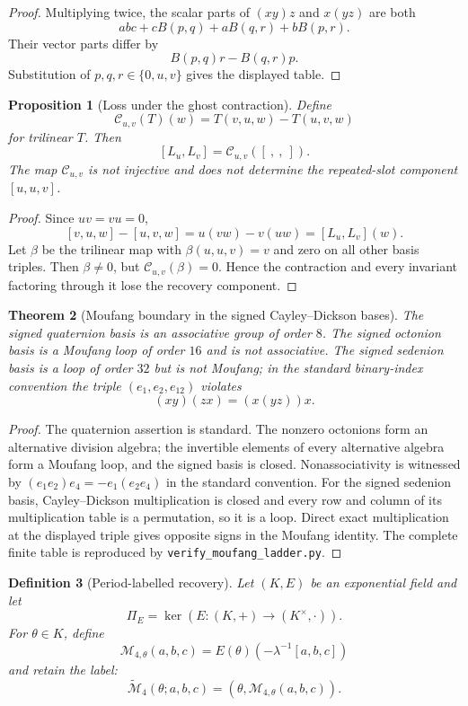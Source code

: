 \documentclass[11pt]{article}
\newtheorem{definition}{Definition}
\newtheorem{theorem}[definition]{Theorem}
\newtheorem{proposition}[definition]{Proposition}
\begin{document}
\begin{proof}
Multiplying twice, the scalar parts of $(xy)z$ and $x(yz)$ are both
\[
abc+cB(p,q)+aB(q,r)+bB(p,r).
\]
Their vector parts differ by
\[
B(p,q)r-B(q,r)p.
\]
Substitution of $p,q,r\in\{0,u,v\}$ gives the displayed table.
\end{proof}

\begin{proposition}[Loss under the ghost contraction]
Define
\[
\mathcal C_{u,v}(T)(w)=T(v,u,w)-T(u,v,w)
\]
for trilinear $T$.  Then
\[
[L_u,L_v]=\mathcal C_{u,v}([\ ,\ ,\ ]).
\]
The map $\mathcal C_{u,v}$ is not injective and does not determine the repeated-slot component $[u,u,v]$.
\end{proposition}

\begin{proof}
Since $uv=vu=0$,
\[
[v,u,w]-[u,v,w]=u(vw)-v(uw)=[L_u,L_v](w).
\]
Let $\beta$ be the trilinear map with $\beta(u,u,v)=v$ and zero on all other basis triples.  Then $\beta\ne0$, but $\mathcal C_{u,v}(\beta)=0$.  Hence the contraction and every invariant factoring through it lose the recovery component.
\end{proof}

\begin{theorem}[Moufang boundary in the signed Cayley--Dickson bases]
The signed quaternion basis is an associative group of order $8$.  The signed octonion basis is a Moufang loop of order $16$ and is not associative.  The signed sedenion basis is a loop of order $32$ but is not Moufang; in the standard binary-index convention the triple $(e_1,e_2,e_{12})$ violates
\[
(xy)(zx)=(x(yz))x.
\]
\end{theorem}

\begin{proof}
The quaternion assertion is standard.  The nonzero octonions form an alternative division algebra; the invertible elements of every alternative algebra form a Moufang loop, and the signed basis is closed.  Nonassociativity is witnessed by $(e_1e_2)e_4=-e_1(e_2e_4)$ in the standard convention.  For the signed sedenion basis, Cayley--Dickson multiplication is closed and every row and column of its multiplication table is a permutation, so it is a loop.  Direct exact multiplication at the displayed triple gives opposite signs in the Moufang identity.  The complete finite table is reproduced by \texttt{verify\_moufang\_ladder.py}.
\end{proof}

\begin{definition}[Period-labelled recovery]
Let $(K,E)$ be an exponential field and let
\[
\Pi_E=\ker(E:(K,+)\to(K^\times,\cdot)).
\]
For $\theta\in K$, define
\[
\mathcal M_{4,\theta}(a,b,c)=E(\theta)(-\lambda^{-1}[a,b,c])
\]
and retain the label:
\[
\widetilde{\mathcal M}_4(\theta;a,b,c)
=(\theta,\mathcal M_{4,\theta}(a,b,c)).
\]
\end{definition}
\end{document}

